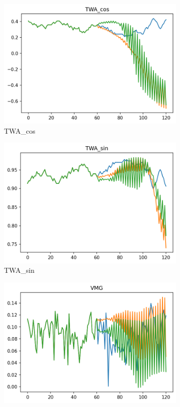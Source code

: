 \begin{figure}[ht]
\begin{subfigure}[b]{0.32\textwidth}
         \includegraphics[width=\textwidth]{figures/prediction-plots-joint/TWA_cos.png}
         \caption{TWA\_cos}
     \end{subfigure}
     \begin{subfigure}[b]{0.32\textwidth}
         \centering
         \includegraphics[width=\textwidth]{figures/prediction-plots-joint/TWA_sin.png}
         \caption{TWA\_sin}
     \end{subfigure}
     \begin{subfigure}[b]{0.32\textwidth}
         \centering
         \includegraphics[width=\textwidth]{figures/prediction-plots-joint/VMG.png}

\end{subfigure}
\end{figure}

